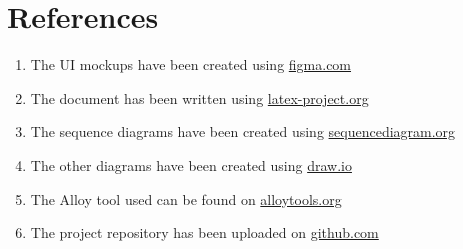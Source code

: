\chapter{References}

\begin{enumerate}
    \item The UI mockups have been created using \url{figma.com}
    \item The document has been written using \url{latex-project.org}
    \item The sequence diagrams have been created using \url{sequencediagram.org}
    \item The other diagrams have been created using \url{draw.io}
    \item The Alloy tool used can be found on \url{alloytools.org}
    \item The project repository has been uploaded on \url{github.com}
\end{enumerate}